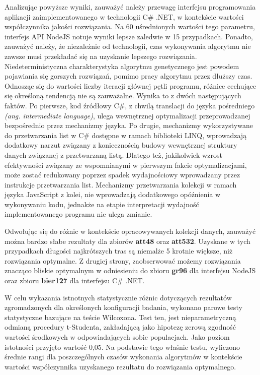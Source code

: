 Analizując powyższe wyniki, zauważyć należy przewagę interfejsu programowania aplikacji zaimplementowanego w technologii C\# .NET, w kontekście wartości współczynnika jakości rozwiązania. Na 60 uśrednionych wartości tego parametru, interfejs API NodeJS notuje wyniki lepsze zaledwie w 15 przypadkach. Ponadto, zauważyć należy, że niezależnie od technologii, czas wykonywania algorytmu nie zawsze musi przekładać się na uzyskanie lepszego rozwiązania. Niedeterministyczna charakterystyka algorytmu genetycznego jest powodem pojawiania się gorszych rozwiązań, pomimo pracy algorytmu przez dłuższy czas. Odnosząc się do wartości liczby iteracji głównej pętli programu, różnice cechujące się określoną tendencją nie są zauważalne. Wynika to z dwóch następujących faktów. Po pierwsze, kod źródłowy C\#, z chwilą translacji do języka pośredniego \textit{(ang. intermediate language)}, ulega wewnętrznej optymalizacji przeprowadzanej bezpośrednio przez mechanizmy języka. Po drugie, mechanizmy wykorzystywane do przetwarzania list w C\# dostępne w ramach biblioteki LINQ, wprowadzają dodatkowy narzut związany z koniecznością budowy wewnętrznej struktury danych związanej z przetwarzaną listą. Dlatego też, jakikolwiek wzrost efektywności związany ze wspomnianymi w pierwszym fakcie optymalizacjami, może zostać redukowany poprzez spadek wydajnościowy wprowadzany przez instrukcje przetwarzania list. Mechanizmy przetwarzania kolekcji w ramach języka JavaScript z kolei, nie wprowadzają dodatkowego opóźnienia w wykonywaniu kodu, jednakże na etapie interpretacji wydajność implementowanego programu nie ulega zmianie.

Odwołując się do różnic w kontekście opracowywanych kolekcji danych, zauważyć można bardzo słabe rezultaty dla zbiorów \textbf{att48} oraz \textbf{att532}. Uzyskane w tych przypadkach długości najkrótszych tras są niemalże 5 krotnie większe, niż rozwiązania optymalne. Z drugiej strony, zaobserwować możemy rozwiązania znacząco bliskie optymalnym w odniesieniu do zbioru \textbf{gr96} dla interfejsu NodeJS oraz zbioru \textbf{bier127} dla interfejsu C\# .NET.

W celu wykazania istnotnych statystycznie różnic dotyczących rezultatów zgromadzonych dla określonych konfiguracji badania, wykonano parowe testy statystyczne bazujące na teście Wilcoxona. Test ten, jest nieparametryczną odmianą procedury t-Studenta, zakładającą jako hipotezę zerową zgodność wartości środkowych w odpowiadających sobie populacjach. Jako poziom istotności przyjęto wartość 0,05. Na podstawie tego właśnie testu, wyliczono średnie rangi dla poszczególnych czasów wykonania algorytmów w kontekście wartości współczynnika uzyskanego rezultatu do rozwiązania optymalnego.

